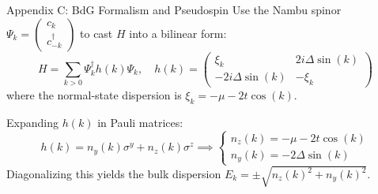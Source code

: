 \documentclass[aspectratio=169, 12pt]{beamer}
\begin{document}
\begin{frame}{Appendix C: BdG Formalism and Pseudospin}
  Use the Nambu spinor $\Psi_k = \begin{pmatrix} c_k \\ c^\dagger_{-k} \end{pmatrix}$ to cast $H$ into a bilinear form:
  \begin{equation}
    H = \sum_{k>0} \Psi^\dagger_k h(k) \Psi_k, \quad
    h(k) = \begin{pmatrix} \xi_k & 2i\Delta\sin(k) \\ -2i\Delta\sin(k) & -\xi_k \end{pmatrix}
  \end{equation}
  where the normal-state dispersion is $\xi_k = -\mu - 2t\cos(k)$. 
  
  Expanding $h(k)$ in Pauli matrices:
  \begin{equation}
    h(k) = n_y(k)\sigma^y + n_z(k)\sigma^z \implies 
    \begin{cases}
      n_z(k) = -\mu - 2t\cos(k) \\
      n_y(k) = -2\Delta\sin(k)
    \end{cases}
  \end{equation}
  Diagonalizing this yields the bulk dispersion $E_k = \pm\sqrt{n_z(k)^2 + n_y(k)^2}$.
\end{frame}
\end{document}
